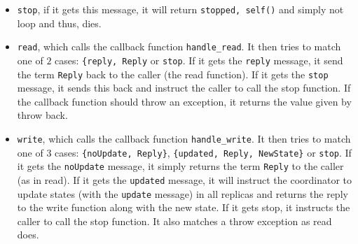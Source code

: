 \documentclass[a4paper]{article}
\begin{document}
\begin{itemize}
\item \texttt{stop}, if it gets this message, it will return \texttt{stopped, self()} and simply not loop and thus, dies.
\item \texttt{read}, which calls the callback function \texttt{handle\_read}. It then tries to match one of $2$ cases: \texttt{\{reply, Reply} or \texttt{stop}. If it gets the \texttt{reply} message, it send the term \texttt{Reply} back to the caller (the read function). If it gets the \texttt{stop} message, it sends this back and instruct the caller to call the stop function. If the callback function should throw an exception, it returns the value given by throw back.
\item \texttt{write}, which calls the callback function \texttt{handle\_write}. It then tries to match one of $3$ cases: \texttt{\{noUpdate, Reply\}}, \texttt{\{updated, Reply, NewState\}} or \texttt{stop}. If it gets the \texttt{noUpdate} message, it simply returns the term \texttt{Reply} to the caller (as in read). If it gets the \texttt{updated} message, it will instruct the coordinator to update states (with the \texttt{update} message) in all replicas and returns the reply to the write function along with the new state. If it gets stop, it instructs the caller to call the stop function. It also matches a throw exception as read does.
\end{itemize}
\end{document}
